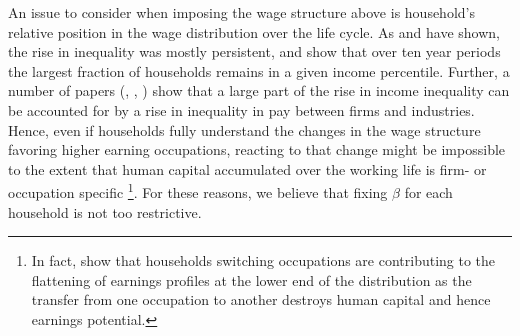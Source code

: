 An issue to consider when imposing the wage structure above is household's relative position in the wage distribution over the life cycle. As \citet{KopczukSaezSong2010} and \citet{DHPRV2013} have shown, the rise in inequality was mostly persistent, and \citet{JanttiJenkins2013} show that over ten year periods the largest fraction of households remains in a given income percentile. Further, a number of papers (\citet{CardHeinigKline2013}, \citet{BernardJensen1995}, \citealp{AutorKatzKearney2008}) show that a large part of the rise in income inequality can be accounted for by a rise in inequality in pay between firms and industries. Hence, even if households fully understand the changes in the wage structure favoring higher earning occupations, reacting to that change might be impossible to the extent that human capital accumulated over the working life is firm- or occupation specific \footnote{In fact, \citet{KambourovManovskii2009} show that households switching occupations are contributing to the flattening of earnings profiles at the lower end of the distribution as the transfer from one occupation to another destroys human capital and hence earnings potential.}. For these reasons, we believe that fixing $\beta$ for each household is not too restrictive. 


\pagebreak

